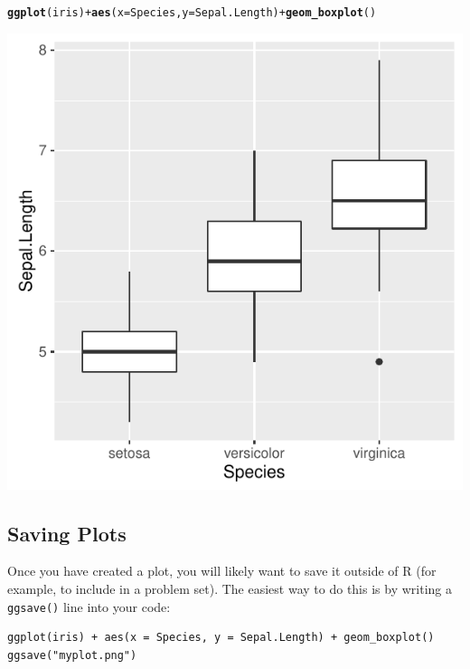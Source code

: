 \documentclass[12pt]{article}\usepackage[]{graphicx}\usepackage[]{color}
\makeatletter
\def\maxwidth{ %
  \ifdim\Gin@nat@width>\linewidth
    \linewidth
  \else
    \Gin@nat@width
  \fi
}
\newcommand{\hlopt}[1]{\textcolor[rgb]{0,0,0}{#1}}%
\newcommand{\hlstd}[1]{\textcolor[rgb]{0.345,0.345,0.345}{#1}}%
\newcommand{\hlkwc}[1]{\textcolor[rgb]{0.333,0.667,0.333}{#1}}%
\newcommand{\hlkwd}[1]{\textcolor[rgb]{0.737,0.353,0.396}{\textbf{#1}}}%
\newenvironment{kframe}{%
 \def\at@end@of@kframe{}%
 \ifinner\ifhmode%
  \def\at@end@of@kframe{\end{minipage}}%
  \begin{minipage}{\columnwidth}%
 \fi\fi%
 \def\FrameCommand##1{\hskip\@totalleftmargin \hskip-\fboxsep
 \colorbox{shadecolor}{##1}\hskip-\fboxsep
     \hskip-\linewidth \hskip-\@totalleftmargin \hskip\columnwidth}%
 \MakeFramed {\advance\hsize-\width
   \@totalleftmargin\z@ \linewidth\hsize
   \@setminipage}}%
 {\par\unskip\endMakeFramed%
 \at@end@of@kframe}
\newenvironment{knitrout}{}{} %
\makeatother
\begin{document}
\begin{knitrout}
\color{fgcolor}\begin{kframe}
\begin{alltt}
\hlkwd{ggplot}\hlstd{(iris)} \hlopt{+} \hlkwd{aes}\hlstd{(}\hlkwc{x} \hlstd{= Species,} \hlkwc{y} \hlstd{= Sepal.Length)} \hlopt{+} \hlkwd{geom_boxplot}\hlstd{()}
\end{alltt}
\end{kframe}
\includegraphics[width=\maxwidth]{figure/unnamed-chunk-6-1} 

\end{knitrout}



\subsection{Saving Plots}
Once you have created a plot, you will likely want to save it outside of R (for example, to include in a problem set). The easiest way to do this is by writing a \texttt{ggsave()} line into your code:

\begin{verbatim}
ggplot(iris) + aes(x = Species, y = Sepal.Length) + geom_boxplot()
ggsave("myplot.png")
\end{verbatim}
\end{document}

